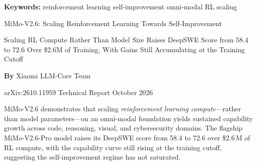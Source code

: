 \documentclass[10pt,twocolumn]{article}
\begin{document}
\setlength{\parindent}{0pt}
\setlength{\parskip}{4pt}

{\small\color{keywordgray}\textbf{Keywords:}
  reinforcement learning \textbullet{}
  self-improvement \textbullet{}
  omni-modal \textbullet{}
  RL scaling}\par\vspace{4pt}

{\LARGE\bfseries\raggedright
  MiMo-V2.6: Scaling Reinforcement Learning Towards Self-Improvement}\par\vspace{4pt}

{\large\itshape\raggedright
  Scaling RL Compute Rather Than Model Size Raises DeepSWE Score
  from 58.4 to 72.6 Over \$2.6M of Training,
  With Gains Still Accumulating at the Training Cutoff}\par\vspace{6pt}

{\small\textbf{By} Xiaomi LLM-Core Team}\par\vspace{2pt}

{\small\color{keywordgray}arXiv:2610.11959 \textbullet{} Technical Report \textbullet{} October 2026}
\par\vspace{2pt}\noindent{\color{rulered}\rule{\columnwidth}{0.6pt}}\vspace{6pt}

MiMo-V2.6 demonstrates that scaling \emph{reinforcement learning compute}---rather
than model parameters---on an omni-modal foundation yields sustained capability growth
across code, reasoning, visual, and cybersecurity domains. The flagship MiMo-V2.6-Pro
model raises its DeepSWE score from 58.4 to 72.6 over \$2.6\,M of RL compute, with the
capability curve still rising at the training cutoff, suggesting the self-improvement
regime has not saturated.
\end{document}

